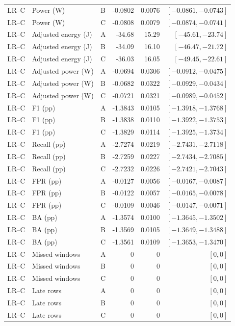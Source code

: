 \begin{longtable}{lllrrr}
LR--C & Power (W) & B & -0.0802 & 0.0076 & $[-0.0861,-0.0743]$\\
LR--C & Power (W) & C & -0.0808 & 0.0079 & $[-0.0874,-0.0741]$\\
LR--C & Adjusted energy (J) & A & -34.68 & 15.29 & $[-45.61,-23.74]$\\
LR--C & Adjusted energy (J) & B & -34.09 & 16.10 & $[-46.47,-21.72]$\\
LR--C & Adjusted energy (J) & C & -36.03 & 16.05 & $[-49.45,-22.61]$\\
LR--C & Adjusted power (W) & A & -0.0694 & 0.0306 & $[-0.0912,-0.0475]$\\
LR--C & Adjusted power (W) & B & -0.0682 & 0.0322 & $[-0.0929,-0.0434]$\\
LR--C & Adjusted power (W) & C & -0.0721 & 0.0321 & $[-0.0989,-0.0452]$\\
LR--C & F1 (pp) & A & -1.3843 & 0.0105 & $[-1.3918,-1.3768]$\\
LR--C & F1 (pp) & B & -1.3838 & 0.0110 & $[-1.3922,-1.3753]$\\
LR--C & F1 (pp) & C & -1.3829 & 0.0114 & $[-1.3925,-1.3734]$\\
LR--C & Recall (pp) & A & -2.7274 & 0.0219 & $[-2.7431,-2.7118]$\\
LR--C & Recall (pp) & B & -2.7259 & 0.0227 & $[-2.7434,-2.7085]$\\
LR--C & Recall (pp) & C & -2.7232 & 0.0226 & $[-2.7421,-2.7043]$\\
LR--C & FPR (pp) & A & -0.0127 & 0.0056 & $[-0.0167,-0.0087]$\\
LR--C & FPR (pp) & B & -0.0122 & 0.0057 & $[-0.0165,-0.0078]$\\
LR--C & FPR (pp) & C & -0.0109 & 0.0046 & $[-0.0147,-0.0071]$\\
LR--C & BA (pp) & A & -1.3574 & 0.0100 & $[-1.3645,-1.3502]$\\
LR--C & BA (pp) & B & -1.3569 & 0.0105 & $[-1.3649,-1.3488]$\\
LR--C & BA (pp) & C & -1.3561 & 0.0109 & $[-1.3653,-1.3470]$\\
LR--C & Missed windows & A & 0 & 0 & $[0,0]$\\
LR--C & Missed windows & B & 0 & 0 & $[0,0]$\\
LR--C & Missed windows & C & 0 & 0 & $[0,0]$\\
LR--C & Late rows & A & 0 & 0 & $[0,0]$\\
LR--C & Late rows & B & 0 & 0 & $[0,0]$\\
LR--C & Late rows & C & 0 & 0 & $[0,0]$\\

\end{longtable}
